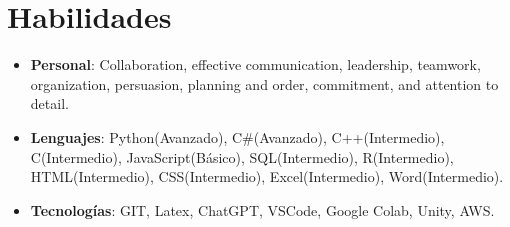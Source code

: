 \documentclass[letterpaper, 10pt]{article}
\newcommand{\resumeSubHeadingListStart}{\begin{itemize}[leftmargin=*]}
\newcommand{\resumeSubHeadingListEnd}{\end{itemize}}
\begin{document}
\section{Habilidades}
    \resumeSubHeadingListStart
        \item {
            \textbf{Personal}{: Collaboration, effective communication, leadership, teamwork, organization, persuasion, planning and order, commitment, and attention to detail.}
        }
        \item{
            \textbf{Lenguajes}{: Python(Avanzado), C\#(Avanzado), C++(Intermedio), C(Intermedio), JavaScript(Básico), SQL(Intermedio), R(Intermedio), HTML(Intermedio), CSS(Intermedio), Excel(Intermedio), Word(Intermedio).}
        }
        \item {
            \textbf{Tecnologías}{: GIT, Latex, ChatGPT, VSCode, Google Colab, Unity, AWS.}
        }
    \resumeSubHeadingListEnd


\end{document}
